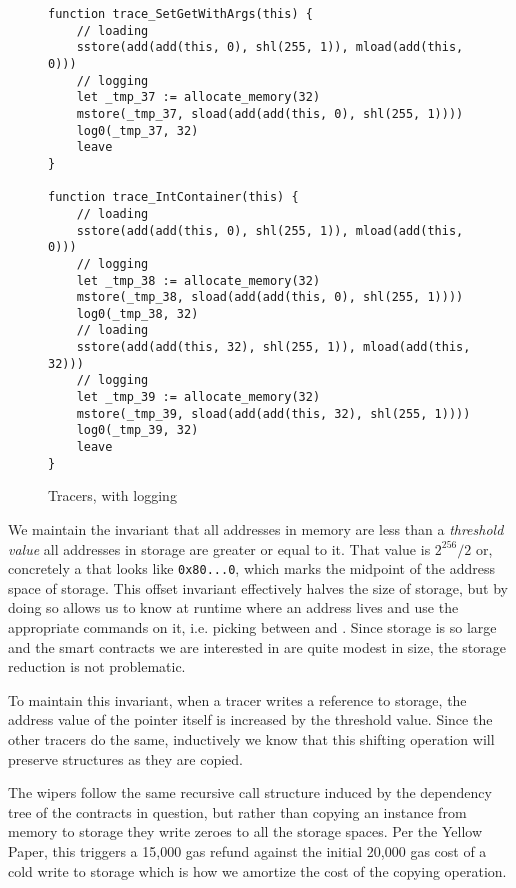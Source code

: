 \begin{figure}[hbtp]
    \caption{Tracers, with logging}
    \label{code.4}
    \begin{lstlisting}[language=yul,frame=single]
function trace_SetGetWithArgs(this) {
    // loading
    sstore(add(add(this, 0), shl(255, 1)), mload(add(this, 0)))
    // logging
    let _tmp_37 := allocate_memory(32)
    mstore(_tmp_37, sload(add(add(this, 0), shl(255, 1))))
    log0(_tmp_37, 32)
    leave
}

function trace_IntContainer(this) {
    // loading
    sstore(add(add(this, 0), shl(255, 1)), mload(add(this, 0)))
    // logging
    let _tmp_38 := allocate_memory(32)
    mstore(_tmp_38, sload(add(add(this, 0), shl(255, 1))))
    log0(_tmp_38, 32)
    // loading
    sstore(add(add(this, 32), shl(255, 1)), mload(add(this, 32)))
    // logging
    let _tmp_39 := allocate_memory(32)
    mstore(_tmp_39, sload(add(add(this, 32), shl(255, 1))))
    log0(_tmp_39, 32)
    leave
}
    \end{lstlisting}
\end{figure}

We maintain the invariant that all addresses in memory are less than
a \emph{threshold value} all addresses in storage are greater or equal to
it. That value is $2^{256}/2$ or, concretely a  that looks
like \texttt{0x80...0}, which marks the midpoint of the address space of
storage. This offset invariant effectively halves the size of storage, but
by doing so allows us to know at runtime where an address lives and use the
appropriate commands on it, i.e. picking between 
and . Since storage is so large and the smart contracts we
are interested in are quite modest in size, the storage reduction is not
problematic.

To maintain this invariant, when a tracer writes a reference to storage,
the address value of the pointer itself is increased by the threshold
value. Since the other tracers do the same, inductively we know that this
shifting operation will preserve structures as they are copied.

The wipers follow the same recursive call structure induced by the
dependency tree of the contracts in question, but rather than copying an
instance from memory to storage they write zeroes to all the storage
spaces. Per the Yellow Paper, this triggers a 15,000 gas refund against the
initial 20,000 gas cost of a cold write to storage which is how we amortize
the cost of the copying operation. \cite{TODO}

